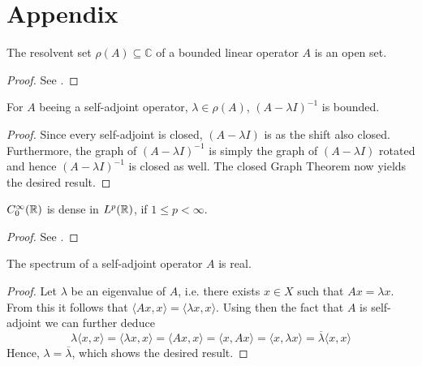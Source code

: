 \chapter*{Appendix}  


\begin{atheorem}
	The resolvent set $\rho(A) \subseteq \mathbb{C}$ of a bounded linear operator $A$ is an open set.
	
	\begin{proof}
		See \cite[page 259]{werner2006funkana}.
	\end{proof}
\end{atheorem}

\begin{atheorem}
	For $A$ beeing a self-adjoint operator, $\lambda \in \rho(A)$, $(A - \lambda I)^{-1}$ is bounded.
	
	\begin{proof}
		Since every self-adjoint is closed, $(A - \lambda I)$ is as the shift also closed. Furthermore, the graph of $(A - \lambda I)^{-1}$ is simply the graph of $(A - \lambda I)$ rotated and hence $(A - \lambda I)^{-1}$ is closed as well. The closed Graph Theorem now yields the desired result.
	\end{proof}
\end{atheorem}

\begin{atheorem}
	$C_{0}^{\infty}(\mathbb{R})$ is dense in $L^{p}(\mathbb{R})$, if $1 \leq p < \infty$.
	
	\begin{proof}
		See \cite[page 82]{werner2006funkana}. %
	\end{proof}
\end{atheorem}

\begin{atheorem}
	The spectrum of a self-adjoint operator $A$ is real.
	
	\begin{proof}
		Let $\lambda$ be an eigenvalue of $A$, i.e. there exists $x \in X$ such that $A x = \lambda x$. From this it follows that $\langle A x, x \rangle = \langle \lambda x , x \rangle$. Using then the fact that $A$ is self-adjoint we can further deduce
		\[ \lambda \langle x , x \rangle = \langle \lambda x , x \rangle = \langle A x, x \rangle = \langle x, A x \rangle = \langle x , \lambda x \rangle = \overline{\lambda} \langle  x , x \rangle \]
		Hence, $\lambda = \overline{\lambda}$, which shows the desired result.
	\end{proof}
\end{atheorem}

